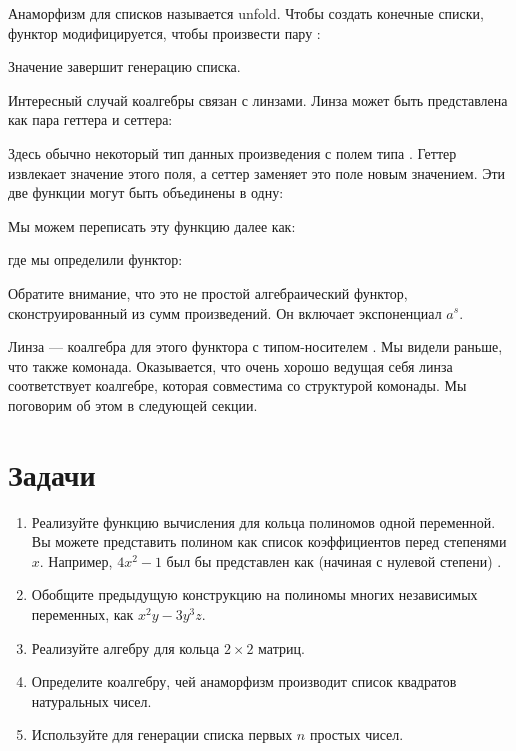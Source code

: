 Анаморфизм для списков называется unfold. Чтобы создать конечные списки,
функтор модифицируется, чтобы произвести пару :

Значение  завершит генерацию списка.

Интересный случай коалгебры связан с линзами. Линза может быть
представлена как пара геттера и сеттера:

Здесь  обычно некоторый тип данных произведения с полем типа
. Геттер извлекает значение этого поля, а сеттер
заменяет это поле новым значением. Эти две функции могут быть
объединены в одну:

Мы можем переписать эту функцию далее как:

где мы определили функтор:

Обратите внимание, что это не простой алгебраический функтор, сконструированный из сумм
произведений. Он включает экспоненциал $a^s$.

Линза --- коалгебра для этого функтора с типом-носителем .
Мы видели раньше, что  также комонада. Оказывается,
что очень хорошо ведущая себя линза соответствует коалгебре, которая совместима
со структурой комонады. Мы поговорим об этом в следующей секции.

\section{Задачи}

\begin{enumerate}
  \tightlist
  \item
        Реализуйте функцию вычисления для кольца полиномов одной
        переменной. Вы можете представить полином как список коэффициентов перед
        степенями $x$. Например, $4x^2-1$ был бы
        представлен как (начиная с нулевой степени)
        \code{{[}-1, 0, 4{]}}.
  \item
        Обобщите предыдущую конструкцию на полиномы многих
        независимых переменных, как $x^2y-3y^3z$.
  \item
        Реализуйте алгебру для кольца $2\times{}2$ матриц.
  \item
        Определите коалгебру, чей анаморфизм производит список квадратов
        натуральных чисел.
  \item
        Используйте  для генерации списка первых $n$ простых чисел.
\end{enumerate}
